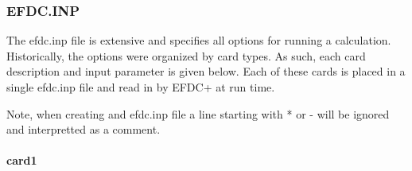 \documentclass[letterpaper,10pt,english]{sphinxmanual}
\begin{document}
\subsubsection{EFDC.INP}
\label{\detokenize{inputfiles/runcontrol/index:efdc-inp}}
The efdc.inp file is extensive and specifies all options for running a calculation. Historically, the options were organized by card types.  As such, each card description and input parameter is given below. Each of these cards is placed in a single efdc.inp file and read in by EFDC+ at run time.

Note, when creating and efdc.inp file a line starting with * or - will be ignored and interpretted as a comment.


\paragraph{card1}
\end{document}
